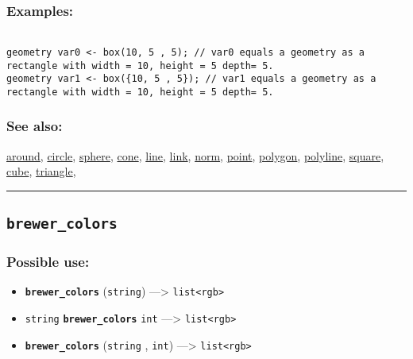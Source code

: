 \documentclass[]{book}
\providecommand{\tightlist}{%
  \setlength{\itemsep}{0pt}\setlength{\parskip}{0pt}}
\theoremstyle{definition}
\theoremstyle{definition}
\theoremstyle{definition}
\theoremstyle{remark}
\begin{document}
\subsubsection{Examples:}\label{examples-58}

\begin{verbatim}
 
geometry var0 <- box(10, 5 , 5); // var0 equals a geometry as a rectangle with width = 10, height = 5 depth= 5. 
geometry var1 <- box({10, 5 , 5}); // var1 equals a geometry as a rectangle with width = 10, height = 5 depth= 5.
\end{verbatim}

\subsubsection{See also:}\label{see-also-47}

\href{operators-a-to-a.html\#around}{around},
\href{operators-b-to-c.html\#circle}{circle},
\href{operators-s-to-z.html\#sphere}{sphere},
\href{operators-b-to-c.html\#cone}{cone},
\href{operators-i-to-m.html\#line}{line},
\href{operators-i-to-m.html\#link}{link},
\href{operators-n-to-r.html\#norm}{norm},
\href{operators-n-to-r.html\#point}{point},
\href{operators-n-to-r.html\#polygon}{polygon},
\href{operators-n-to-r.html\#polyline}{polyline},
\href{operators-s-to-z.html\#square}{square},
\href{operators-b-to-c.html\#cube}{cube},
\href{operators-s-to-z.html\#triangle}{triangle},

\begin{center}\rule{0.5\linewidth}{\linethickness}\end{center}

\subsection{\texorpdfstring{\texttt{brewer\_colors}}{brewer\_colors}}\label{brewer_colors}

\subsubsection{Possible use:}\label{possible-use-77}

\begin{itemize}
\tightlist
\item
  \textbf{\texttt{brewer\_colors}} (\texttt{string}) ---\textgreater{}
  \texttt{list\textless{}rgb\textgreater{}}
\item
  \texttt{string} \textbf{\texttt{brewer\_colors}} \texttt{int}
  ---\textgreater{} \texttt{list\textless{}rgb\textgreater{}}
\item
  \textbf{\texttt{brewer\_colors}} (\texttt{string} , \texttt{int})
  ---\textgreater{} \texttt{list\textless{}rgb\textgreater{}}
\end{itemize}
\end{document}
